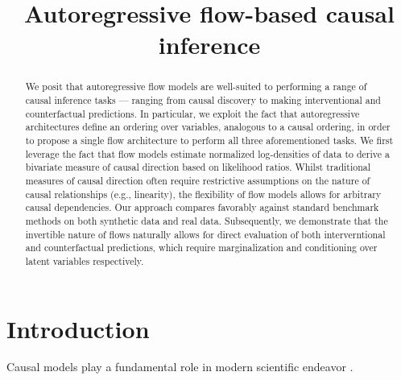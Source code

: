 \documentclass[]{article}
\title{Autoregressive flow-based causal inference}
\author{}
\date{}
\begin{document}
\maketitle

\begin{abstract}
We posit that autoregressive flow models are well-suited to 
performing a range of causal inference tasks --- ranging from causal discovery to making
interventional and 
counterfactual predictions. 
In particular, we exploit the fact that 
autoregressive architectures %
define an 
ordering over 
variables,
analogous to a causal ordering, in order to 
propose a single flow architecture to perform all three aforementioned tasks.  
%
We first leverage the fact that flow models estimate normalized 
log-densities of data %
to derive a bivariate measure of causal direction based on likelihood ratios. 
Whilst traditional measures of causal direction often require restrictive assumptions on the nature of 
causal relationships (e.g., linearity),
the flexibility of flow models allows for arbitrary causal dependencies.
%
%
Our approach compares favorably against standard 
benchmark methods on both synthetic data and 
real data.
%
%
Subsequently, we demonstrate that the invertible nature of flows naturally allows for 
direct evaluation of both 
interverntional and counterfactual predictions, which require 
marginalization and conditioning over latent variables respectively. 
\end{abstract}

\section{Introduction}
\label{sec:intro}

Causal models play a fundamental role in modern scientific endeavor \citep{Spirtes2000, Pearl2009}. \\
\end{document}
